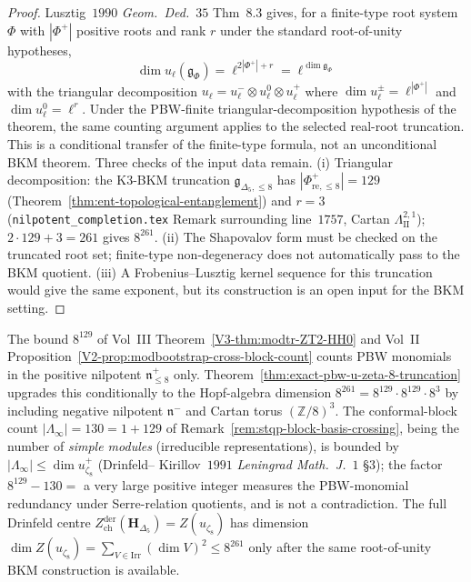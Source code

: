 \begin{proof}
Lusztig~$1990$ \emph{Geom.\ Ded.}~$35$ Thm~$8.3$ gives, for a
finite-type root system $\Phi$ with $|\Phi^+|$ positive roots and
rank $r$ under the standard root-of-unity hypotheses,
\[
 \dim u_\ell(\mathfrak g_\Phi) = \ell^{2|\Phi^+| + r} = \ell^{\dim\mathfrak g_\Phi}
\]
with the triangular decomposition
$u_\ell = u_\ell^- \otimes u_\ell^0 \otimes u_\ell^+$ where
$\dim u_\ell^\pm = \ell^{|\Phi^+|}$ and $\dim u_\ell^0 =
\ell^r$. Under the PBW-finite triangular-decomposition hypothesis
of the theorem, the same counting argument applies to the selected
real-root truncation. This is a conditional transfer of the
finite-type formula, not an unconditional BKM theorem. Three checks
of the input data remain.
\textup{(i)} Triangular decomposition: the K$3$-BKM truncation
$\mathfrak g_{\Delta_5, \le 8}$ has $|\Phi^+_{\mathrm{re}, \le 8}|
= 129$ (Theorem~\ref{thm:ent-topological-entanglement}) and
$r = 3$ (\texttt{nilpotent\_completion.tex} Remark surrounding
line~$1757$, Cartan $\Lambda^{2, 1}_{\mathrm{II}}$);
$2 \cdot 129 + 3 = 261$ gives $8^{261}$.
\textup{(ii)} The Shapovalov form must be checked on the truncated
root set; finite-type non-degeneracy does not automatically pass to
the BKM quotient.
\textup{(iii)} A Frobenius--Lusztig kernel sequence for this
truncation would give the same exponent, but its construction is an
open input for the BKM setting.
\end{proof}

\begin{remark}
\label{rem:as-8-129-nilpotent-half-scope}
%
The bound $8^{129}$ of Vol~III
Theorem~\ref{V3-thm:modtr-ZT2-HH0}
and Vol~II
Proposition~\ref{V2-prop:modbootstrap-cross-block-count}
counts PBW monomials in the positive nilpotent $\mathfrak n^+_{\le 8}$
only. Theorem~\ref{thm:exact-pbw-u-zeta-8-truncation} upgrades this
conditionally to the Hopf-algebra dimension $8^{261} = 8^{129} \cdot
8^{129} \cdot 8^3$ by including negative nilpotent $\mathfrak n^-$
and Cartan torus $(\mathbb Z/8)^3$. The conformal-block count
$|\Lambda_\infty| = 130 = 1 + 129$ of
Remark~\ref{rem:stqp-block-basis-crossing}, being the number of
\emph{simple modules} (irreducible representations), is bounded
by $|\Lambda_\infty| \le \dim u_{\zeta_8}^+$ (Drinfeld--
Kirillov~$1991$ \emph{Leningrad Math.\ J.}~$1$ \S $3$); the
factor $8^{129} - 130 = $ a very large positive integer measures
the PBW-monomial redundancy under Serre-relation quotients, and
is not a contradiction. The full Drinfeld centre
$Z^{\mathrm{der}}_{\mathrm{ch}}(\mathbf H_{\Delta_5}) =
Z(u_{\zeta_8})$ has dimension
$\dim Z(u_{\zeta_8}) = \sum_{V \in \mathrm{Irr}}(\dim V)^2
\le 8^{261}$ only after the same root-of-unity BKM construction is
available.
\end{remark}

